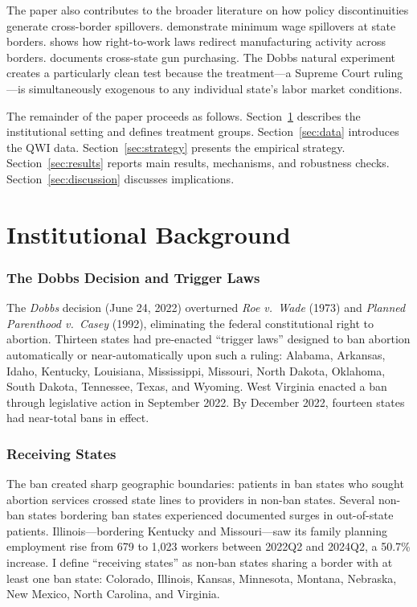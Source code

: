 \documentclass[12pt]{article}
\begin{document}
The paper also contributes to the broader literature on how policy discontinuities generate cross-border spillovers. \citet{dube2010} demonstrate minimum wage spillovers at state borders. \citet{holmes1998} shows how right-to-work laws redirect manufacturing activity across borders. \citet{knight2013} documents cross-state gun purchasing. The Dobbs natural experiment creates a particularly clean test because the treatment---a Supreme Court ruling---is simultaneously exogenous to any individual state's labor market conditions.

The remainder of the paper proceeds as follows. Section~\ref{sec:background} describes the institutional setting and defines treatment groups. Section~\ref{sec:data} introduces the QWI data. Section~\ref{sec:strategy} presents the empirical strategy. Section~\ref{sec:results} reports main results, mechanisms, and robustness checks. Section~\ref{sec:discussion} discusses implications.


\section{Institutional Background}
\label{sec:background}

\subsubsection*{The Dobbs Decision and Trigger Laws}
The \textit{Dobbs} decision (June 24, 2022) overturned \textit{Roe v.\ Wade} (1973) and \textit{Planned Parenthood v.\ Casey} (1992), eliminating the federal constitutional right to abortion. Thirteen states had pre-enacted ``trigger laws'' designed to ban abortion automatically or near-automatically upon such a ruling: Alabama, Arkansas, Idaho, Kentucky, Louisiana, Mississippi, Missouri, North Dakota, Oklahoma, South Dakota, Tennessee, Texas, and Wyoming. West Virginia enacted a ban through legislative action in September 2022. By December 2022, fourteen states had near-total bans in effect.

\subsubsection*{Receiving States}
The ban created sharp geographic boundaries: patients in ban states who sought abortion services crossed state lines to providers in non-ban states. Several non-ban states bordering ban states experienced documented surges in out-of-state patients. Illinois---bordering Kentucky and Missouri---saw its family planning employment rise from 679 to 1,023 workers between 2022Q2 and 2024Q2, a 50.7\% increase. I define ``receiving states'' as non-ban states sharing a border with at least one ban state: Colorado, Illinois, Kansas, Minnesota, Montana, Nebraska, New Mexico, North Carolina, and Virginia.
\end{document}
